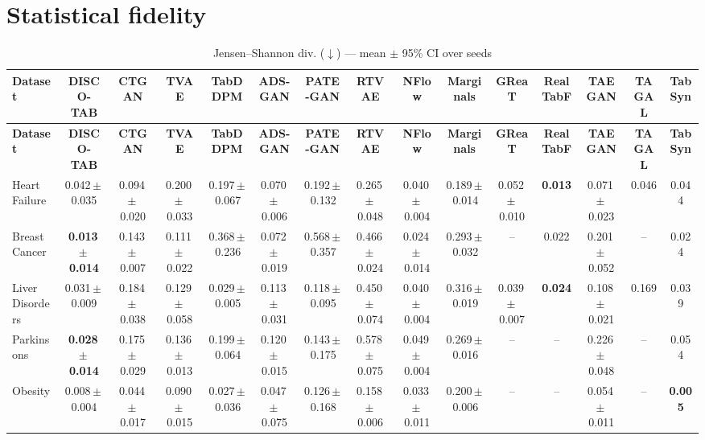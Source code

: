 \documentclass[8pt]{extarticle}
\begin{document}
\section*{Statistical fidelity}
\begin{longtable}{l*{14}{c}}
\caption{Jensen--Shannon div. ($\downarrow$) --- mean $\pm$ 95\% CI over seeds}\\
\toprule
\textbf{Dataset} & \textbf{DISCO-TAB} & \textbf{CTGAN} & \textbf{TVAE} & \textbf{TabDDPM} & \textbf{ADS-GAN} & \textbf{PATE-GAN} & \textbf{RTVAE} & \textbf{NFlow} & \textbf{Marginals} & \textbf{GReaT} & \textbf{RealTabF} & \textbf{TAEGAN} & \textbf{TAGAL} & \textbf{TabSyn} \\
\midrule
\endfirsthead
\toprule
\textbf{Dataset} & \textbf{DISCO-TAB} & \textbf{CTGAN} & \textbf{TVAE} & \textbf{TabDDPM} & \textbf{ADS-GAN} & \textbf{PATE-GAN} & \textbf{RTVAE} & \textbf{NFlow} & \textbf{Marginals} & \textbf{GReaT} & \textbf{RealTabF} & \textbf{TAEGAN} & \textbf{TAGAL} & \textbf{TabSyn} \\
\midrule
\endhead
\bottomrule
\endfoot
Heart Failure & 0.042\,$\pm$\,0.035 & 0.094\,$\pm$\,0.020 & 0.200\,$\pm$\,0.033 & 0.197\,$\pm$\,0.067 & 0.070\,$\pm$\,0.006 & 0.192\,$\pm$\,0.132 & 0.265\,$\pm$\,0.048 & 0.040\,$\pm$\,0.004 & 0.189\,$\pm$\,0.014 & 0.052\,$\pm$\,0.010 & \textbf{0.013} & 0.071\,$\pm$\,0.023 & 0.046 & 0.044 \\
Breast Cancer & \textbf{0.013\,$\pm$\,0.014} & 0.143\,$\pm$\,0.007 & 0.111\,$\pm$\,0.022 & 0.368\,$\pm$\,0.236 & 0.072\,$\pm$\,0.019 & 0.568\,$\pm$\,0.357 & 0.466\,$\pm$\,0.024 & 0.024\,$\pm$\,0.014 & 0.293\,$\pm$\,0.032 & -- & 0.022 & 0.201\,$\pm$\,0.052 & -- & 0.024 \\
Liver Disorders & 0.031\,$\pm$\,0.009 & 0.184\,$\pm$\,0.038 & 0.129\,$\pm$\,0.058 & 0.029\,$\pm$\,0.005 & 0.113\,$\pm$\,0.031 & 0.118\,$\pm$\,0.095 & 0.450\,$\pm$\,0.074 & 0.040\,$\pm$\,0.004 & 0.316\,$\pm$\,0.019 & 0.039\,$\pm$\,0.007 & \textbf{0.024} & 0.108\,$\pm$\,0.021 & 0.169 & 0.039 \\
Parkinsons & \textbf{0.028\,$\pm$\,0.014} & 0.175\,$\pm$\,0.029 & 0.136\,$\pm$\,0.013 & 0.199\,$\pm$\,0.064 & 0.120\,$\pm$\,0.015 & 0.143\,$\pm$\,0.175 & 0.578\,$\pm$\,0.075 & 0.049\,$\pm$\,0.004 & 0.269\,$\pm$\,0.016 & -- & -- & 0.226\,$\pm$\,0.048 & -- & 0.054 \\
Obesity & 0.008\,$\pm$\,0.004 & 0.044\,$\pm$\,0.017 & 0.090\,$\pm$\,0.015 & 0.027\,$\pm$\,0.036 & 0.047\,$\pm$\,0.075 & 0.126\,$\pm$\,0.168 & 0.158\,$\pm$\,0.006 & 0.033\,$\pm$\,0.011 & 0.200\,$\pm$\,0.006 & -- & -- & 0.054\,$\pm$\,0.011 & -- & \textbf{0.005} \\

\end{longtable}
\end{document}
